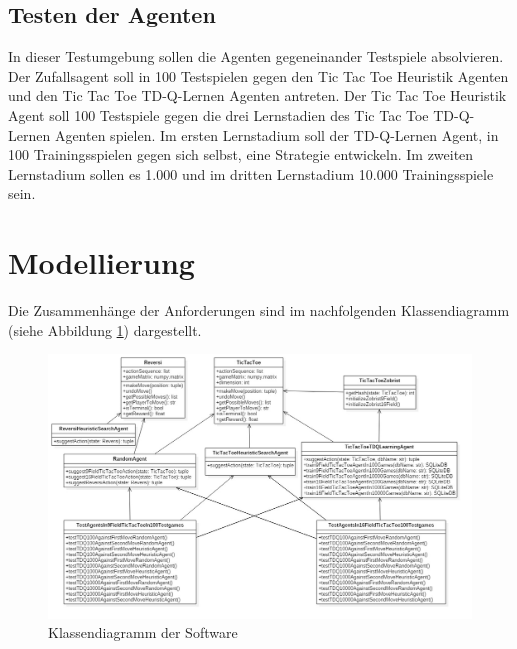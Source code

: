 \subsection{Testen der Agenten}
In dieser Testumgebung sollen die Agenten gegeneinander Testspiele absolvieren. Der Zufallsagent soll in 100 Testspielen gegen den Tic Tac Toe Heuristik Agenten und den Tic Tac Toe TD-Q-Lernen Agenten antreten. Der Tic Tac Toe Heuristik Agent soll 100 Testspiele gegen die drei Lernstadien des Tic Tac Toe TD-Q-Lernen Agenten spielen. Im ersten Lernstadium soll der TD-Q-Lernen Agent, in 100 Trainingsspielen gegen sich selbst, eine Strategie entwickeln. Im zweiten Lernstadium sollen es 1.000 und im dritten Lernstadium 10.000 Trainingsspiele sein.

\section{Modellierung}
Die Zusammenhänge der Anforderungen sind im nachfolgenden Klassendiagramm (siehe Abbildung \ref{fig:klassendiagramm}) dargestellt.

\begin{figure}[!htbp]
  \centering
  \includegraphics[angle = 90, scale = 0.5]{inhalt/abbildungen/projectClassDiagram.jpg}
  \caption{Klassendiagramm der Software}
  \label{fig:klassendiagramm}
\end{figure} 
